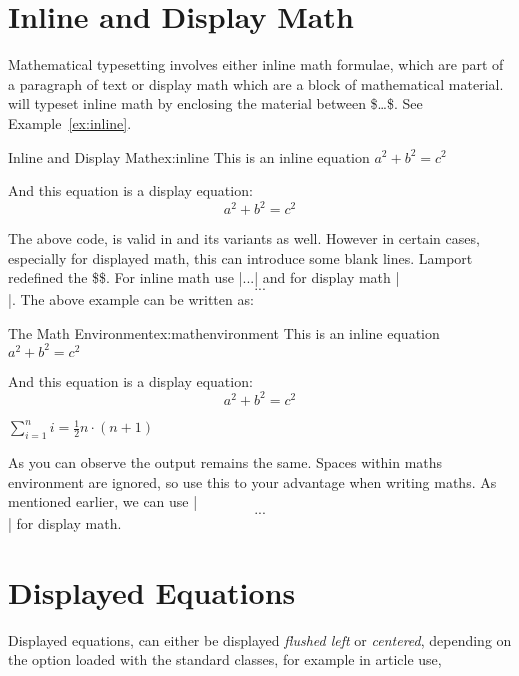 \pagestyle{headings}
\normalfont

\section{Inline and Display Math}
Mathematical typesetting involves either inline math formulae, which are part of a paragraph of text or display math which are a block of mathematical material. \tex will typeset inline math by enclosing the material between  \$\ldots\$. See Example~\ref{ex:inline}.
\bigskip

\begin{texexample}[]{Inline and Display Math}{ex:inline}
This is an inline equation \(a^2+b^2=c^2\)

And this equation is a display equation:
\[a^2+b^2=c^2\]
\end{texexample}


The above code, is valid in \latex and its variants as well. However in certain cases, especially for displayed math, this can introduce some blank lines. Lamport redefined
the \$\$. For inline math use |\(...\)| and for display math |\[...\] |. The above example can be written as:
\bigskip

\begin{texexample}{The Math Environment}{ex:mathenvironment}
 This is an inline equation \(a^2+b^2=c^2\)

 And this equation is a display equation:
 \[a^2+b^2=c^2\]

 \begin{math}
 \sum_{i=1}^{n}i=\frac{1}{2}n\cdot(n+1)
 \end{math}
\end{texexample}



As you can observe the output remains the same.  Spaces within  maths environment are ignored, so use this to your advantage when writing maths. As mentioned earlier, we can use |\[...\]| for display math.


\section{Displayed Equations}


Displayed equations, can either be displayed \emph{flushed left} or \emph{centered}, depending on the option loaded with the standard classes, for example in article use,


